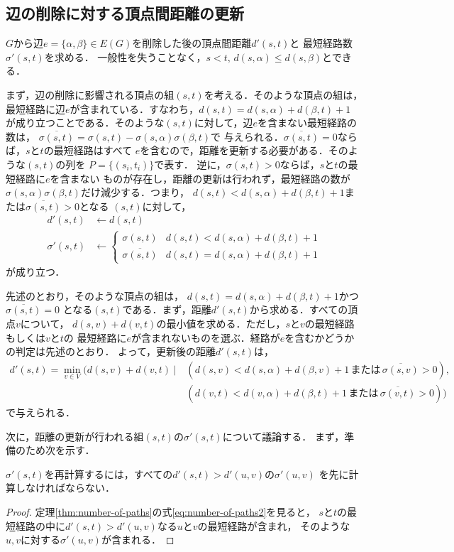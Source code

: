 \subsection{辺の削除に対する頂点間距離の更新}
\label{subsect:update-lower-bound-of-diameter}
$G$から辺$e=\{\alpha,\beta\}\in E(G)$を削除した後の頂点間距離$d'(s,t)$と
最短経路数$\sigma'(s,t)$を求める．
一般性を失うことなく，$s<t,\,d(s,\alpha)\leq d(s,\beta)$とできる．

まず，辺の削除に影響される頂点の組$(s,t)$を考える．そのような頂点の組は，
最短経路に辺$e$が含まれている．すなわち，$d(s,t) = d(s,\alpha)+d(\beta,t)+1$
が成り立つことである．そのような$(s,t)$に対して，辺$e$を含まない最短経路の数は，
$\overline{\sigma(s,t)}=\sigma(s,t)-\sigma(s,\alpha)\sigma(\beta,t)$で
与えられる．$\overline{\sigma(s,t)}=0$ならば，$s$と$t$の最短経路はすべて
$e$を含むので，距離を更新する必要がある．そのような$(s,t)$の列を
$P=\{(s_i,t_i)\}$で表す．
逆に，$\overline{\sigma(s,t)}>0$ならば，$s$と$t$の最短経路に$e$を含まない
ものが存在し，距離の更新は行われず，最短経路の数が
$\sigma(s,\alpha)\sigma(\beta,t)$だけ減少する．つまり，
$d(s,t)<d(s,\alpha)+d(\beta,t)+1$または$\overline{\sigma(s,t)}>0$となる
$(s,t)$に対して，
\begin{align*}
  d'(s,t) &\gets d(s,t) \\
  \sigma'(s,t) &\gets
  \begin{cases}
    \sigma(s,t) & d(s,t) < d(s,\alpha) + d(\beta,t) + 1 \\
    \overline{\sigma(s,t)} & d(s,t) = d(s,\alpha) + d(\beta,t) + 1
  \end{cases}
\end{align*}
が成り立つ．

先述のとおり，そのような頂点の組は，
$d(s,t)=d(s,\alpha)+d(\beta,t)+1$かつ$\overline{\sigma(s,t)}=0$
となる$(s,t)$である．まず，距離$d'(s,t)$から求める．すべての頂点$v$について，
$d(s,v)+d(v,t)$の最小値を求める．ただし，$s$と$v$の最短経路もしくは$v$と$t$の
最短経路に$e$が含まれないものを選ぶ．経路が$e$を含むかどうかの判定は先述のとおり．
よって，更新後の距離$d'(s,t)$は，
\begin{align*}
  d'(s,t) = \min_{v\in V}(d(s,v)+d(v,t)\:|\:
  &(d(s,v)<d(s,\alpha)+d(\beta,v)+1\,または\,\overline{\sigma(s,v)}>0),\\
  &(d(v,t)<d(v,\alpha)+d(\beta,t)+1\,または\,\overline{\sigma(v,t)}>0))
\end{align*}
で与えられる．

次に，距離の更新が行われる組$(s,t)$の$\sigma'(s,t)$について議論する．
まず，準備のため次を示す．
\begin{collary}
  $\sigma'(s,t)$を再計算するには，すべての$d'(s,t)>d'(u,v)$の$\sigma'(u,v)$
  を先に計算しなければならない．
\end{collary}
\begin{proof}
  定理\ref{thm:number-of-paths}の式\ref{eq:number-of-paths2}を見ると，
  $s$と$t$の最短経路の中に$d'(s,t)>d'(u,v)$なる$u$と$v$の最短経路が含まれ，
  そのような$u,v$に対する$\sigma'(u,v)$が含まれる．
\end{proof}

